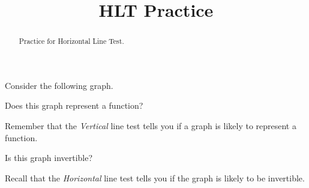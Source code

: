 \documentclass{ximera}
\title{HLT Practice}
\begin{document}
\begin{abstract}
    Practice for Horizontal Line Test.
\end{abstract}
\maketitle


\begin{problem}
    Consider the following graph.
    \begin{center}
    \end{center}
    
    Does this graph represent a function?
    \begin{multipleChoice}
    \end{multipleChoice}
    \begin{feedback}
        Remember that the \textit{Vertical} line test tells you if a graph is likely to represent a function.
    \end{feedback}
    
    \begin{problem}
        Is this graph invertible?
        \begin{multipleChoice}
        \end{multipleChoice}
        \begin{feedback}
            Recall that the \textit{Horizontal} line test tells you if the graph is likely to be invertible.
        \end{feedback}
    \end{problem}
\end{problem}
\end{document}
